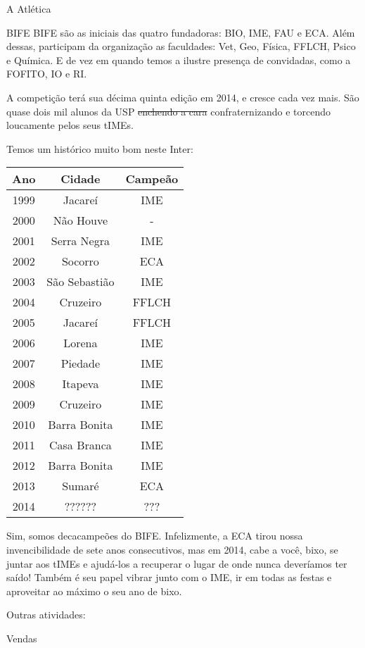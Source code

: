 \begin{secao}{A Atlética}
\begin{subsecao}{BIFE}
BIFE são as iniciais das quatro fundadoras: BIO, IME, FAU e ECA.
Além dessas, participam da organização as faculdades: Vet, Geo, Física, FFLCH,
Psico e Química. E de vez em quando temos a ilustre presença de convidadas, como
a FOFITO, IO e RI.

A competição terá sua décima quinta edição em 2014, e cresce cada vez mais.
São quase dois mil alunos da USP \sout{enchendo a cara} confraternizando e
torcendo loucamente pelos seus tIMEs.

Temos um histórico muito bom neste Inter:
\begin{center}
	\begin{tabular}{c|c|c}
	  Ano & Cidade & Campeão\\
	  \hline
	  1999 & Jacareí & IME\\
	  2000 & Não Houve & - \\
	  2001 & Serra Negra & IME\\
	  2002 & Socorro & ECA\\
	  2003 & São Sebastião & IME\\
	  2004 & Cruzeiro & FFLCH\\
	  2005 & Jacareí & FFLCH\\
	  2006 & Lorena & IME\\
	  2007 & Piedade & IME\\
	  2008 & Itapeva & IME\\
	  2009 & Cruzeiro & IME\\
	  2010 & Barra Bonita & IME\\
	  2011 & Casa Branca & IME\\
	  2012 & Barra Bonita & IME\\
	  2013 & Sumaré & ECA\\
	  2014 & ?????? & ???
	\end{tabular}
\end{center}

Sim, somos decacampeões do BIFE.
Infelizmente, a ECA tirou nossa invencibilidade de sete anos consecutivos, mas
em 2014, cabe a você, bixo, se juntar aos tIMEs e ajudá-los a recuperar o lugar
de onde nunca deveríamos ter saído! Também é seu papel vibrar junto com o IME,
ir em todas as festas e aproveitar ao máximo o seu ano de bixo.

\end{subsecao}

Outras atividades:

\begin{subsecao}{Vendas}


\end{subsecao}
\end{secao}

